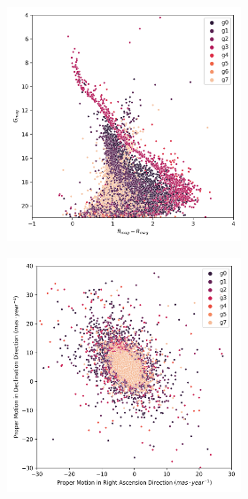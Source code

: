 \documentclass[11pt, a4paper, english]{book}
\begin{document}
\begin{figure}[H]
\begin{subfigure}{0.9\textwidth}
\begin{subfigure}[t]{0.30\textwidth}
    \end{subfigure}
    \hfill
    \begin{subfigure}[t]{0.30\textwidth}
      \centering
      \includegraphics[width=\textwidth]{../figures/ngc_2516/dec_hr_diagram_ngc_2516.png}
    \end{subfigure}
  \end{subfigure}
  \caption{NGC 2516 DEC characterization.}
  \centering
  \begin{subfigure}{0.9\textwidth}
    \centering
    \begin{subfigure}[t]{0.30\textwidth}
      \centering
      \includegraphics[width=\textwidth]{../figures/ngc_2516/dec_pm_filtered_ngc_2516.png}

\end{subfigure}
\end{subfigure}
\end{figure}
\end{document}
